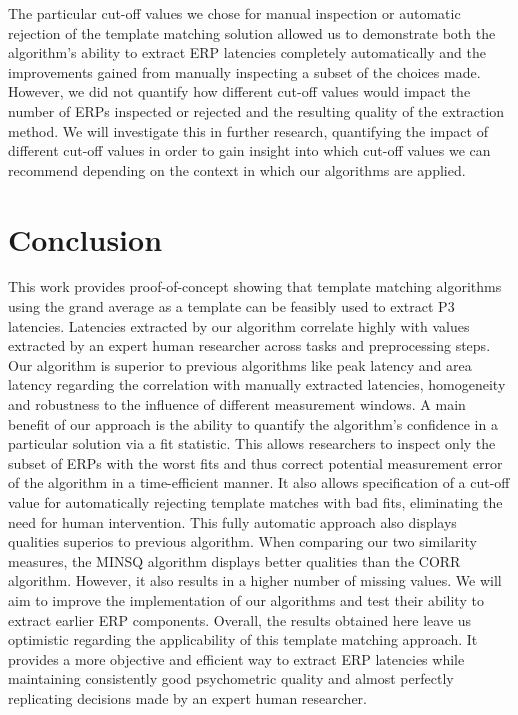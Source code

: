 \documentclass[
  man]{apa7}
\begin{document}
The particular cut-off values we chose for manual inspection or automatic rejection of the template matching solution allowed us to demonstrate both the algorithm's ability to extract ERP latencies completely automatically and the improvements gained from manually inspecting a subset of the choices made. However, we did not quantify how different cut-off values would impact the number of ERPs inspected or rejected and the resulting quality of the extraction method. We will investigate this in further research, quantifying the impact of different cut-off values in order to gain insight into which cut-off values we can recommend depending on the context in which our algorithms are applied.

\hypertarget{conclusion}{%
\section{Conclusion}\label{conclusion}}

This work provides proof-of-concept showing that template matching algorithms using the grand average as a template can be feasibly used to extract P3 latencies. Latencies extracted by our algorithm correlate highly with values extracted by an expert human researcher across tasks and preprocessing steps. Our algorithm is superior to previous algorithms like peak latency and area latency regarding the correlation with manually extracted latencies, homogeneity and robustness to the influence of different measurement windows. A main benefit of our approach is the ability to quantify the algorithm's confidence in a particular solution via a fit statistic. This allows researchers to inspect only the subset of ERPs with the worst fits and thus correct potential measurement error of the algorithm in a time-efficient manner. It also allows specification of a cut-off value for automatically rejecting template matches with bad fits, eliminating the need for human intervention. This fully automatic approach also displays qualities superios to previous algorithm. When comparing our two similarity measures, the MINSQ algorithm displays better qualities than the CORR algorithm. However, it also results in a higher number of missing values. We will aim to improve the implementation of our algorithms and test their ability to extract earlier ERP components. Overall, the results obtained here leave us optimistic regarding the applicability of this template matching approach. It provides a more objective and efficient way to extract ERP latencies while maintaining consistently good psychometric quality and almost perfectly replicating decisions made by an expert human researcher.
\end{document}
